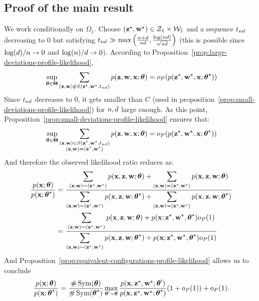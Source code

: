 \documentclass[bj]{imsart}
\numberwithin{equation}{section}
\theoremstyle{plain}
\theoremstyle{remark}
\begin{document}
\subsection{Proof of the main result}\label{sec:proofbigth}

\proofbegin We work conditionally on $\Omega_1$. Choose $(\mathbf{z}^\star, \mathbf{w}^\star)
\in \mathcal{Z}_1\times \mathcal{W}_1$ and a sequence $t_{nd}$ decreasing to $0$ but satisfying $t_{nd} \gg \max\left(\frac{n+d}{nd}, \frac{\log(nd)}{\sqrt{nd}}\right)$ (this is possible since $\log(d)/n\rightarrow 0$ and $\log(n)/d\rightarrow 0$). According to Proposition~\ref{prop:large-deviations-profile-likelihood}, 
\begin{equation*}
    \sup_{\btheta \in \bTheta} \sum_{(\bz, \bw) \notin S(\bzs, \bws, \tnd)} \prob(\bz, \bw, \bx; \btheta) = \smallO_P( \prob(\bzs, \bws, \bx; \bthetas) )
\end{equation*}
Since $t_{nd}$ decreases to $0$, it gets smaller than $C$ (used in proposition~\ref{prop:small-deviations-profile-likelihood}) for $n, d$ large enough. As this point, Proposition~\ref{prop:small-deviations-profile-likelihood} ensures that:
\begin{equation*}
    \sup_{\btheta \in \bTheta} \sum_{\substack{(\bz, \bw) \in S(\bzs, \bws, \tnd) \\ (\bz, \bw) \nsim (\bzs, \bws)}} \prob(\bz, \bw, \bx; \btheta) = \smallO_P( \prob(\bzs, \bws, \bx; \bthetas) )
\end{equation*}
And therefore the observed likelihood ratio reduces as:
\begin{align*}
    \frac{\prob(\bx; \btheta)}{\prob(\bx; \bthetas)} & = \frac{\displaystyle \sum_{(\bz, \bw) \sim (\bzs, \bws)} \prob(\bx, \bz, \bw; \btheta) + \sum_{(\bz, \bw) \nsim (\bzs, \bws)} \prob(\bx, \bz, \bw; \btheta)}{\displaystyle \sum_{(\bz, \bw) \sim (\bzs, \bws)} \prob(\bx, \bz, \bw; \bthetas) + \sum_{(\bz, \bw) \nsim (\bzs, \bws)} \prob(\bx, \bz, \bw; \bthetas)} \\
    & = \frac{\displaystyle \sum_{(\bz, \bw) \sim (\bzs, \bws)} \prob(\bx, \bz, \bw; \btheta) + \prob(\bx; \bzs, \bws, \bthetas) \smallO_P(1)}{\displaystyle \sum_{(\bz, \bw) \sim (\bzs, \bws)} \prob(\bx, \bz, \bw; \bthetas) + \prob(\bx; \bzs, \bws, \bthetas) \smallO_P(1)} \\
\end{align*}
And Proposition~\ref{prop:equivalent-configurations-profile-likelihood} allows us to conclude
\begin{equation*}
    \frac{\prob(\bx; \btheta)}{\prob(\bx; \bthetas)} = \frac{\# \Symmetric(\btheta)}{\# \Symmetric(\bthetas)} \max_{\btheta' \sim \btheta} \frac{\prob(\bx, \bzs, \bws; \btheta')}{\prob(\bx, \bzs, \bws; \bthetas)}(1 + \smallO_P(1)) + \smallO_P(1).
\end{equation*} \proofend
\end{document}
